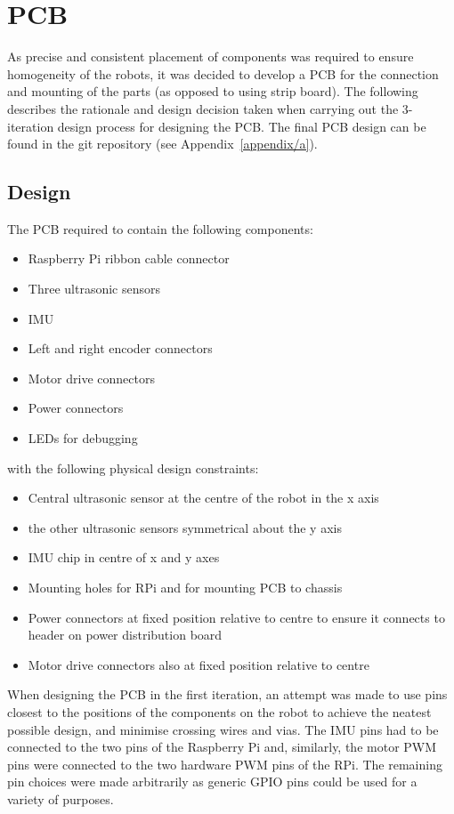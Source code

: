 \section{PCB}\label{elec/pcb}
As precise and consistent placement of components was required to ensure
homogeneity of the robots, it was decided to develop a PCB for the connection
and mounting of the parts (as opposed to using strip board). The following
describes the rationale and design decision taken when carrying out the
3-iteration design process for designing the PCB. The final PCB design can
be found in the git repository (see Appendix~\ref{appendix/a}).

\subsection{Design}\label{elec/pcb/design}
The PCB required to contain the following components:
\begin{itemize}
  \item Raspberry Pi ribbon cable connector
  \item Three ultrasonic sensors
  \item IMU
  \item Left and right encoder connectors
  \item Motor drive connectors
  \item Power connectors
  \item LEDs for debugging
\end{itemize}

with the following physical design constraints:

\begin{itemize}
  \item Central ultrasonic sensor at the centre of the robot in the x axis
  \item the other ultrasonic sensors symmetrical about the y axis
  \item IMU chip in centre of x and y axes
  \item Mounting holes for RPi and for mounting PCB to chassis
  \item Power connectors at fixed position relative to centre to ensure it
  connects to header on power distribution board
  \item Motor drive connectors also at fixed position relative to centre
\end{itemize}

When designing the PCB in 
the first iteration, an attempt was made to use pins closest to the positions
of the components on the robot to achieve the neatest possible design, and minimise 
crossing wires and vias. The IMU pins had to be connected to the two \isc{} 
pins of the Raspberry Pi and, similarly, the motor PWM pins were 
connected to the two hardware PWM pins of the RPi. The remaining pin choices
were made arbitrarily as generic GPIO pins could be used for a variety of purposes.


